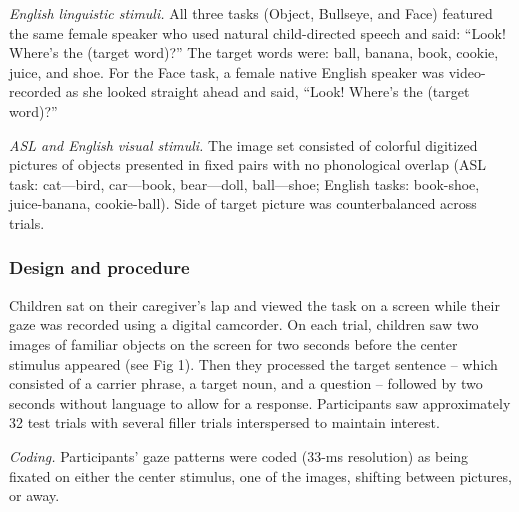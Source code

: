 \documentclass[10pt, letterpaper]{article}
\begin{document}
\emph{English linguistic stimuli.} All three tasks (Object, Bullseye,
and Face) featured the same female speaker who used natural
child-directed speech and said: ``Look! Where's the (target word)?'' The
target words were: ball, banana, book, cookie, juice, and shoe. For the
Face task, a female native English speaker was video-recorded as she
looked straight ahead and said, ``Look! Where's the (target word)?''

\emph{ASL and English visual stimuli.} The image set consisted of
colorful digitized pictures of objects presented in fixed pairs with no
phonological overlap (ASL task: cat---bird, car---book, bear---doll,
ball---shoe; English tasks: book-shoe, juice-banana, cookie-ball). Side
of target picture was counterbalanced across trials.

\subsubsection{Design and procedure}\label{design-and-procedure}

Children sat on their caregiver's lap and viewed the task on a screen
while their gaze was recorded using a digital camcorder. On each trial,
children saw two images of familiar objects on the screen for two
seconds before the center stimulus appeared (see Fig 1). Then they
processed the target sentence -- which consisted of a carrier phrase, a
target noun, and a question -- followed by two seconds without language
to allow for a response. Participants saw approximately 32 test trials
with several filler trials interspersed to maintain interest.

\emph{Coding.} Participants' gaze patterns were coded (33-ms resolution)
as being fixated on either the center stimulus, one of the images,
shifting between pictures, or away.
\end{document}
